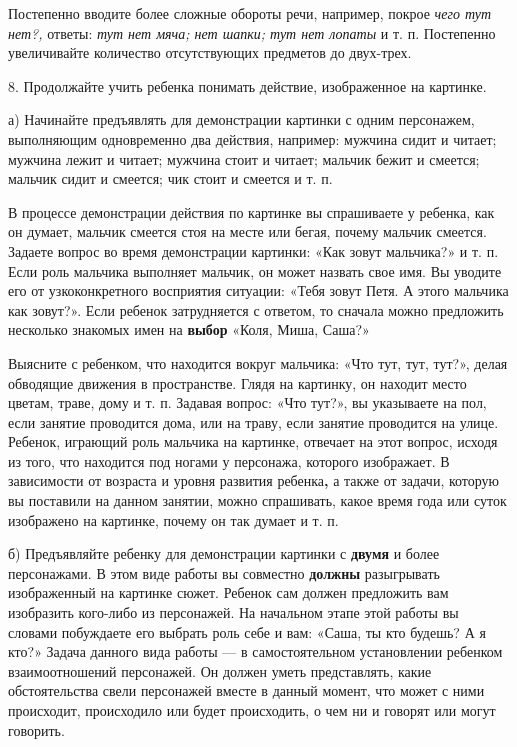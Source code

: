 \documentclass[a5paper]{book}
\renewcommand{\emph}[1]{\textit{#1}}
\begin{document}
Постепенно вводите более сложные обороты речи, например, покрое
\emph{чего тут нет?,} ответы: \emph{тут нет мяча; нет шапки; тут нет
лопаты} и т. п. Постепенно увеличивайте количество отсутствующих
предметов до двух-трех.

8. Продолжайте учить ребенка понимать действие, изображенное на
картинке.

а) Начинайте предъявлять для демонстрации картинки с одним персонажем,
выполняющим одновременно два действия, например: мужчина сидит и читает;
мужчина лежит и читает; мужчина стоит и читает; мальчик бежит и смеется;
мальчик сидит и смеется; чик стоит и смеется и т. п.

В процессе демонстрации действия по картинке вы спрашиваете у ребенка,
как он думает, мальчик смеется стоя на месте или бегая, почему мальчик
смеется. Задаете вопрос во время демонстрации картинки: «Как зовут
мальчика?» и т. п. Если роль мальчика выполняет мальчик, он может
назвать свое имя. Вы уводите его от узкоконкретного восприятия ситуации:
«Тебя зовут Петя. А этого мальчика как зовут?». Если ребенок
затрудняется с ответом, то сначала можно предложить несколько знакомых
имен на \textbf{выбор} «Коля, Миша, Саша?»

Выясните с ребенком, что находится вокруг мальчика: «Что тут, тут,
тут?», делая обводящие движения в пространстве. Глядя на картинку, он
находит место цветам, траве, дому и т. п. Задавая вопрос: «Что тут?», вы
указываете на пол, если занятие проводится дома, или на траву, если
занятие проводится на улице. Ребенок, играющий роль мальчика на
картинке, отвечает на этот вопрос, исходя из того, что находится под
ногами у персонажа, которого изображает. В зависимости от возраста и
уровня развития ребенка\textbf{,} а также от задачи, которую вы
поставили на данном занятии, можно спрашивать, какое время года или
суток изображено на картинке, почему он так думает и т. п.

б) Предъявляйте ребенку для демонстрации картинки с \textbf{двумя} и
более персонажами. В этом виде работы вы совместно \textbf{должны}
разыгрывать изображенный на картинке сюжет. Ребенок сам должен
предложить вам изобразить кого-либо из персонажей. На начальном этапе
этой работы вы словами побуждаете его выбрать роль себе и вам: «Саша, ты
кто будешь? А я кто?» Задача данного вида работы --- в самостоятельном
установлении ребенком взаимоотношений персонажей. Он должен уметь
представлять, какие обстоятельства свели персонажей вместе в данный
момент, что может с ними происходит, происходило или будет происходить,
о чем ни и говорят или могут говорить.
\end{document}
